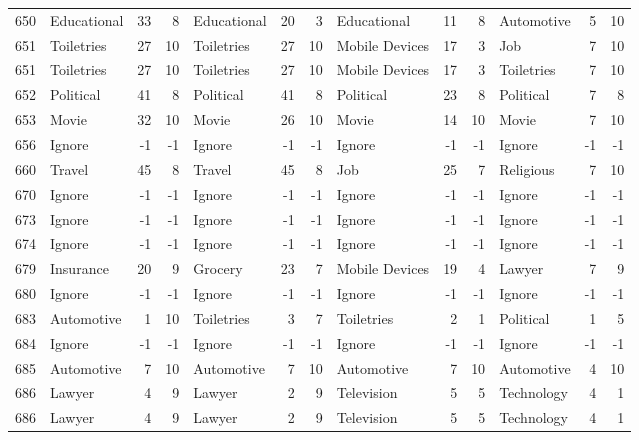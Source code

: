 \begin{figure}[htbp]
\begin{tabular}{rlrrlrrlrrlrr}
    650   & Educational & 33    & 8     & Educational & 20    & 3     & Educational & 11    & 8     & Automotive & 5     & 10 \\
    651   & Toiletries & 27    & 10    & Toiletries & 27    & 10    & Mobile Devices & 17    & 3     & Job   & 7     & 10 \\
    651   & Toiletries & 27    & 10    & Toiletries & 27    & 10    & Mobile Devices & 17    & 3     & Toiletries & 7     & 10 \\
    652   & Political & 41    & 8     & Political & 41    & 8     & Political & 23    & 8     & Political & 7     & 8 \\
    653   & Movie & 32    & 10    & Movie & 26    & 10    & Movie & 14    & 10    & Movie & 7     & 10 \\
    656   & Ignore & -1    & -1    & Ignore & -1    & -1    & Ignore & -1    & -1    & Ignore & -1    & -1 \\
    660   & Travel & 45    & 8     & Travel & 45    & 8     & Job   & 25    & 7     & Religious & 7     & 10 \\
    670   & Ignore & -1    & -1    & Ignore & -1    & -1    & Ignore & -1    & -1    & Ignore & -1    & -1 \\
    673   & Ignore & -1    & -1    & Ignore & -1    & -1    & Ignore & -1    & -1    & Ignore & -1    & -1 \\
    674   & Ignore & -1    & -1    & Ignore & -1    & -1    & Ignore & -1    & -1    & Ignore & -1    & -1 \\
    679   & Insurance & 20    & 9     & Grocery & 23    & 7     & Mobile Devices & 19    & 4     & Lawyer & 7     & 9 \\
    680   & Ignore & -1    & -1    & Ignore & -1    & -1    & Ignore & -1    & -1    & Ignore & -1    & -1 \\
    683   & Automotive & 1     & 10    & Toiletries & 3     & 7     & Toiletries & 2     & 1     & Political & 1     & 5 \\
    684   & Ignore & -1    & -1    & Ignore & -1    & -1    & Ignore & -1    & -1    & Ignore & -1    & -1 \\
    685   & Automotive & 7     & 10    & Automotive & 7     & 10    & Automotive & 7     & 10    & Automotive & 4     & 10 \\
    686   & Lawyer & 4     & 9     & Lawyer & 2     & 9     & Television & 5     & 5     & Technology & 4     & 1 \\
    686   & Lawyer & 4     & 9     & Lawyer & 2     & 9     & Television & 5     & 5     & Technology & 4     & 1 \\

\end{tabular}
\end{figure}
